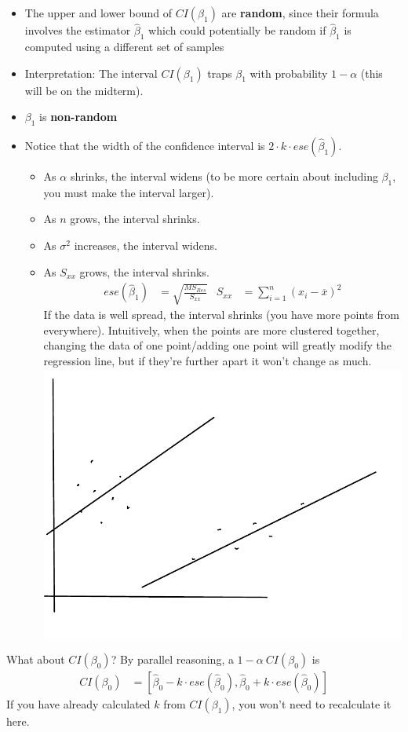 \documentclass[12 pt]{article}
\begin{document}
    \begin{itemize}
    \item The upper and lower bound of $CI(\beta_1)$ are
      \textbf{random}, since their formula involves the estimator
      $\hat{\beta}_1$ which could potentially be random if
      $\hat{\beta}_1$ is computed using a different set of samples
    \item Interpretation: The interval $CI(\beta_1)$ traps $\beta_1$
      with probability $1 - \alpha$ (this will be on the midterm).
    \item $\beta_1$ is \textbf{non-random}
    \item Notice that the width of the confidence interval is $2 \cdot
      k \cdot ese(\hat{\beta}_1)$.
      \begin{itemize}
      \item
        As $\alpha$ shrinks, the interval
        widens (to be more certain about including $\beta_1$, you must
        make the interval larger).
      \item As $n$ grows, the interval shrinks.
      \item As $\sigma^2$ increases, the interval widens.
      \item As $S_{xx}$ grows, the interval shrinks.
        \begin{align*}
          ese(\hat{\beta}_1) & = \sqrt{\frac{MS_{Res}}{S_{xx}}} & S_{xx} & = \sum_{i=1}^n (x_i - \overline{x})^2
        \end{align*}
        If the data is well spread, the interval shrinks (you have
        more points from everywhere). Intuitively, when the points are
        more clustered together, changing the data of one point/adding
        one point will greatly modify the regression line, but if
        they're further apart it won't change as much.\\
        \includegraphics[width=.6\textwidth]{15.pdf}
      \end{itemize}
    \end{itemize}
    What about $CI(\beta_0)$? By parallel reasoning, a $1- \alpha\
    CI(\beta_0)$ is
    \begin{align*}
      CI(\beta_0) & = [\hat{\beta}_0 - k \cdot ese(\hat{\beta}_0), \hat{\beta}_0 + k \cdot ese(\hat{\beta}_0)]
    \end{align*}
    If you have already calculated $k$ from $CI(\beta_1)$, you won't
    need to recalculate it here.
\end{document}
